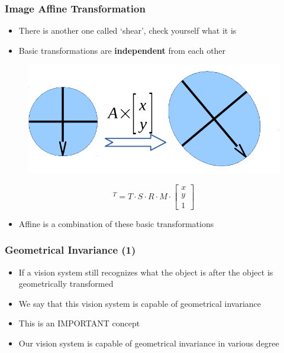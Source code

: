 \begin{frame}
\frametitle {Image Affine Transformation}
\begin{itemize}
	\item {There is another one called `shear', check yourself what it is}
	\item {Basic transformations are \textbf{independent} from each other}
\end{itemize}
\vspace{0.1in}
\begin{figure}
	{\includegraphics[width=0.6\linewidth]{./figs/imgtrans_demo.pdf}}
\end{figure}
\begin{equation}
	[x'~~y'~~1]^T= T{\cdot}S{\cdot}R{\cdot}M{\cdot}\left[ \begin{array}{c}
	x \\
	y \\
	1
	\end{array} \right]
\end{equation}
\begin{itemize}
	\item {Affine is a combination of these basic transformations}
\end{itemize}
\end{frame}

\begin{frame}
\frametitle {Geometrical Invariance (1)}
\begin{itemize}
	\item {If a vision system still recognizes what the object is after the object is geometrically transformed}
	\item {We say that this vision system is capable of geometrical invariance}
	\item {This is an IMPORTANT concept}
	\item {Our vision system is capable of geometrical invariance in various degree}
\end{itemize}

\end{frame}

